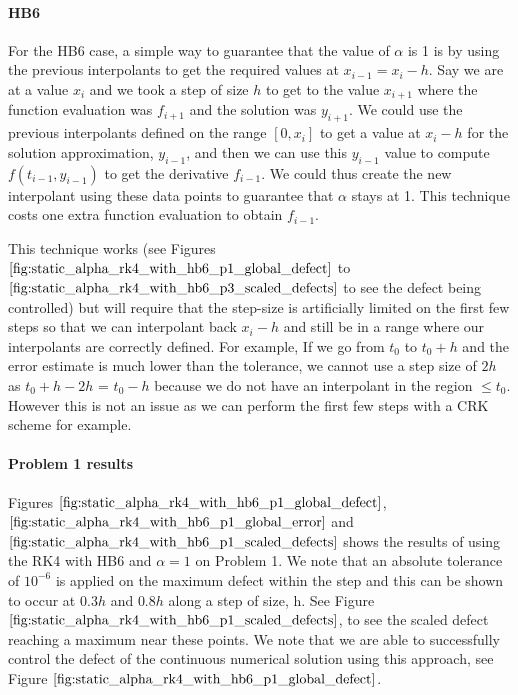 \paragraph{HB6} For the HB6 case, a simple way to guarantee that the value of $\alpha$ is 1 is by using the previous interpolants to get the required values at $x_{i - 1}=x_i - h$. Say we are at a value $x_i$ and we took a step of size $h$ to get to the value $x_{i + 1}$ where the function evaluation was $f_{i + 1}$ and the solution was $y_{i + 1}$. We could use the previous interpolants defined on the range $[0, x_i]$ to get a value at $x_i - h$ for the solution approximation, $y_{i - 1}$, and then we can use this $y_{i-1}$ value to compute $f(t_{i-1}, y_{i-1})$ to get the derivative $f_{i - 1}$.  We could thus create the new interpolant using these data points to guarantee that $\alpha$ stays at 1. This technique costs one extra function evaluation to obtain $f_{i-1}$.

This technique works (see Figures $\ref{fig:static_alpha_rk4_with_hb6_p1_global_defect}$ to $\ref{fig:static_alpha_rk4_with_hb6_p3_scaled_defects}$ to see the defect being controlled) but will require that the step-size is artificially limited on the first few steps so that we can interpolant back $x_i - h$ and still be in a range where our interpolants are correctly defined. For example, If we go from $t_0$ to $t_0 + h$ and the error estimate is much lower than the tolerance, we cannot use a step size of $2h$ as $t_0 + h - 2h$ = $t_0-h$ because we do not have an interpolant in the region $\leq t_0$. However this is not an issue as we can perform the first few steps with a CRK scheme for example.

\paragraph{Problem 1 results}
Figures $\ref{fig:static_alpha_rk4_with_hb6_p1_global_defect}$, $\ref{fig:static_alpha_rk4_with_hb6_p1_global_error}$ and $\ref{fig:static_alpha_rk4_with_hb6_p1_scaled_defects}$ shows the results of using the RK4 with HB6 and $\alpha = 1$ on Problem 1. We note that an absolute tolerance of $10^{-6}$ is applied on the maximum defect within the step and this can be shown to occur at $0.3h$ and $0.8h$ along a step of size, h. See Figure $\ref{fig:static_alpha_rk4_with_hb6_p1_scaled_defects}$, to see the scaled defect reaching a maximum near these points. We note that we are able to successfully control the defect of the continuous numerical solution using this approach, see Figure $\ref{fig:static_alpha_rk4_with_hb6_p1_global_defect}$. 


